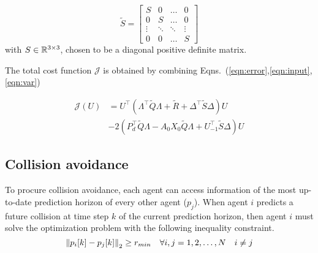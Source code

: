 \begin{equation}
\tilde{S} = \begin{bmatrix}
S & 0& \ldots & 0 \\
0 & S & \ldots & 0 \\
\vdots & \ddots & \ddots & \vdots \\
0 & 0 & \ldots & S
\end{bmatrix}
\end{equation}
with $S \in {\mathbb R}^{3 \times 3}$, chosen to be a diagonal positive definite matrix.

The total cost function $\mathcal{J}$ is obtained by combining Eqns.~(\ref{eqn:error},\ref{eqn:input},\ref{eqn:var})

\begin{equation}
\begin{aligned}
\mathcal{J}(U) &=  U^\top (\Lambda^{\top} \tilde{Q} \Lambda + \tilde{R} + \Delta^\top \tilde{S} \Delta) U \\
 & -2 (P_d^\top \tilde{Q} \Lambda -  A_0X_0 \tilde{Q} \Lambda + U_{-1}^\top \tilde{S} \Delta)U
\end{aligned}
\end{equation}	

\subsection{Collision avoidance}
To procure collision avoidance, each agent can access information of the most up-to-date prediction horizon of every other agent ($p_j$). When agent $i$ predicts a future collision at time step $k$ of the current prediction horizon, then agent $i$ must solve the optimization problem with the following inequality constraint.
\begin{equation}
\label{eqn:coll}
\left\Vert p_i[k]-p_j[k]\right\Vert_2 \geq r_{min} \quad \forall i,j = 1,2,\ldots,N \quad i \neq j
\end{equation}	

